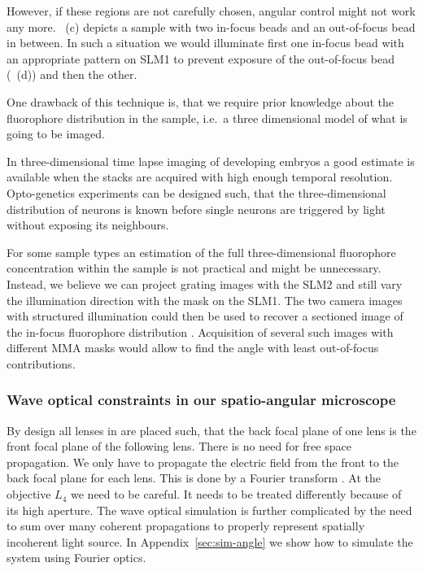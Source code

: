 However, if these regions are not carefully chosen, angular control
might not work any more. ~(c) depicts a
sample with two in-focus beads and an out-of-focus bead in between. In
such a situation we would illuminate first one in-focus bead with an
appropriate pattern on SLM1 to prevent exposure of the out-of-focus
bead (~(d)) and then the other. 

One drawback of this technique is, that we require prior knowledge
about the fluorophore distribution in the sample, i.e.\ a three
dimensional model of what is going to be imaged.

In three-dimensional time lapse imaging of developing embryos a good
estimate is available when the stacks are acquired with high enough
temporal resolution. Opto-genetics experiments can be designed such,
that the three-dimensional distribution of neurons is known before
single neurons are triggered by light without exposing its neighbours.

For some sample types an estimation of the full three-dimensional
fluorophore concentration within the sample is not practical and might
be unnecessary. Instead, we believe we can project grating images with
the SLM2 and still vary the illumination direction with the mask on
the SLM1. The two camera images with structured illumination could then
be used to recover a sectioned image of the in-focus fluorophore
distribution \citep{2008Lim,Bozinovic2008,2009Santos}. Acquisition of
several such images with different MMA masks would allow to find the
angle with least out-of-focus contributions.


\subsubsection{Wave optical constraints in our spatio-angular microscope}
\label{sec:wave-constraints}
By design all lenses in  are placed such, that
the back focal plane of one lens is the front focal plane of the
following lens. There is no need for free space propagation. We only
have to propagate the electric field from the front to the back focal
plane for each lens. This is done by a Fourier transform
\citep{Goodman1996}. At the objective $L_4$ we need to be careful. It
needs to be treated differently because of its high aperture. The wave
optical simulation is further complicated by the need to sum over many
coherent propagations to properly represent spatially incoherent light
source.  In Appendix~\ref{sec:sim-angle} we show how to simulate the
system using Fourier optics.

